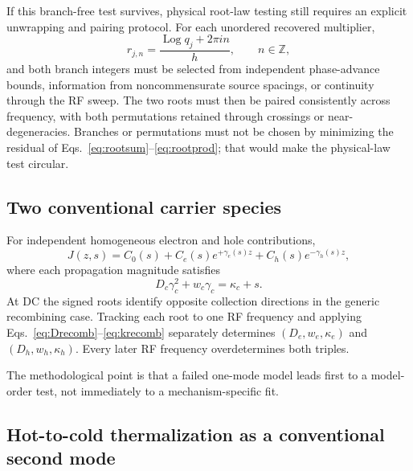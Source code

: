 \documentclass[11pt]{article}
\begin{document}
If this branch-free test survives, physical root-law testing still requires an explicit unwrapping and pairing protocol. For each unordered recovered multiplier,
\begin{equation}
r_{j,n}=\frac{\operatorname{Log}q_j+2\pi i n}{h},\qquad n\in\mathbb Z,
\end{equation}
and both branch integers must be selected from independent phase-advance bounds, information from noncommensurate source spacings, or continuity through the RF sweep. The two roots must then be paired consistently across frequency, with both permutations retained through crossings or near-degeneracies. Branches or permutations must not be chosen by minimizing the residual of Eqs.~\eqref{eq:rootsum}--\eqref{eq:rootprod}; that would make the physical-law test circular.

\subsection{Two conventional carrier species}

For independent homogeneous electron and hole contributions,
\begin{equation}
J(z,s)=C_0(s)+C_e(s)e^{+\gamma_e(s)z}+C_h(s)e^{-\gamma_h(s)z},
\end{equation}
where each propagation magnitude satisfies
\begin{equation}
D_c\gamma_c^2+w_c\gamma_c=\kappa_c+s.
\end{equation}
At DC the signed roots identify opposite collection directions in the generic recombining case. Tracking each root to one RF frequency and applying Eqs.~\eqref{eq:Drecomb}--\eqref{eq:krecomb} separately determines $(D_e,w_e,\kappa_e)$ and $(D_h,w_h,\kappa_h)$. Every later RF frequency overdetermines both triples.

The methodological point is that a failed one-mode model leads first to a model-order test, not immediately to a mechanism-specific fit.

\subsection{Hot-to-cold thermalization as a conventional second mode}
\end{document}
